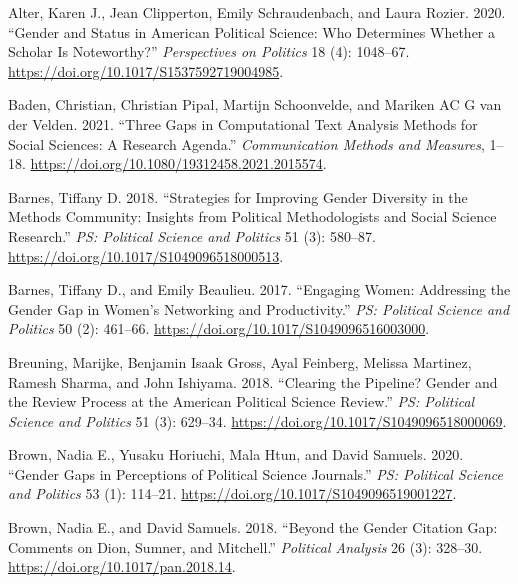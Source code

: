 \documentclass[
]{ccr}
\newlength{\cslhangindent}
\newlength{\cslentryspacingunit} %
\newenvironment{CSLReferences}[2] %
 {%
  \setlength{\parindent}{0pt}
  \ifodd #1
  \let\oldpar\par
  \def\par{\hangindent=\cslhangindent\oldpar}
  \fi
  \setlength{\parskip}{#2\cslentryspacingunit}
 }%
 {}
\begin{document}
\hypertarget{refs}{}
\begin{CSLReferences}{1}{0}
\leavevmode{}%
Alter, Karen J., Jean Clipperton, Emily Schraudenbach, and Laura Rozier.
2020. {``Gender and {Status} in {American} {Political} {Science}: {Who}
{Determines} {Whether} a {Scholar} {Is} {Noteworthy}?''}
\emph{Perspectives on Politics} 18 (4): 1048--67.
\url{https://doi.org/10.1017/S1537592719004985}.

\leavevmode{}%
Baden, Christian, Christian Pipal, Martijn Schoonvelde, and Mariken AC G
van der Velden. 2021. {``Three {Gaps} in {Computational} {Text}
{Analysis} {Methods} for {Social} {Sciences}: {A} {Research}
{Agenda}.''} \emph{Communication Methods and Measures}, 1--18.
\url{https://doi.org/10.1080/19312458.2021.2015574}.

\leavevmode{}%
Barnes, Tiffany D. 2018. {``Strategies for {Improving} {Gender}
{Diversity} in the {Methods} {Community}: {Insights} from {Political}
{Methodologists} and {Social} {Science} {Research}.''} \emph{PS:
Political Science and Politics} 51 (3): 580--87.
\url{https://doi.org/10.1017/S1049096518000513}.

\leavevmode{}%
Barnes, Tiffany D., and Emily Beaulieu. 2017. {``Engaging {Women}:
{Addressing} the {Gender} {Gap} in {Women}'s {Networking} and
{Productivity}.''} \emph{PS: Political Science and Politics} 50 (2):
461--66. \url{https://doi.org/10.1017/S1049096516003000}.

\leavevmode{}%
Breuning, Marijke, Benjamin Isaak Gross, Ayal Feinberg, Melissa
Martinez, Ramesh Sharma, and John Ishiyama. 2018. {``Clearing the
{Pipeline}? {Gender} and the {Review} {Process} at the {American}
{Political} {Science} {Review}.''} \emph{PS: Political Science and
Politics} 51 (3): 629--34.
\url{https://doi.org/10.1017/S1049096518000069}.

\leavevmode{}%
Brown, Nadia E., Yusaku Horiuchi, Mala Htun, and David Samuels. 2020.
{``Gender {Gaps} in {Perceptions} of {Political} {Science}
{Journals}.''} \emph{PS: Political Science and Politics} 53 (1):
114--21. \url{https://doi.org/10.1017/S1049096519001227}.

\leavevmode{}%
Brown, Nadia E., and David Samuels. 2018. {``Beyond the {Gender}
{Citation} {Gap}: {Comments} on {Dion}, {Sumner}, and {Mitchell}.''}
\emph{Political Analysis} 26 (3): 328--30.
\url{https://doi.org/10.1017/pan.2018.14}.


\end{CSLReferences}
\end{document}
